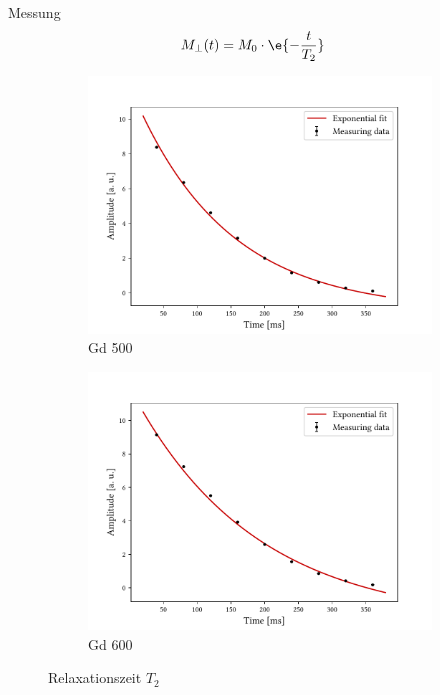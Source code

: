 \begin{frame}{Messung}
	\begin{align*}
	M_\bot(t)&=M_0\cdot\e{-\frac{t}{T_2}}
	\end{align*}
	\begin{figure}
	\centering
		\begin{subfigure}{.49\textwidth}
		\centering
		\includegraphics[scale=.36]{..//figures//f61_abb_2.pdf}
		\caption{Gd 500}
		\end{subfigure}
		\begin{subfigure}{.49\textwidth}
		\centering
		\includegraphics[scale=.36]{..//figures//f61_abb_2_600.pdf}
		\caption{Gd 600}
		\end{subfigure}
	\caption{Relaxationszeit $T_2$}
	\end{figure}
\end{frame}

